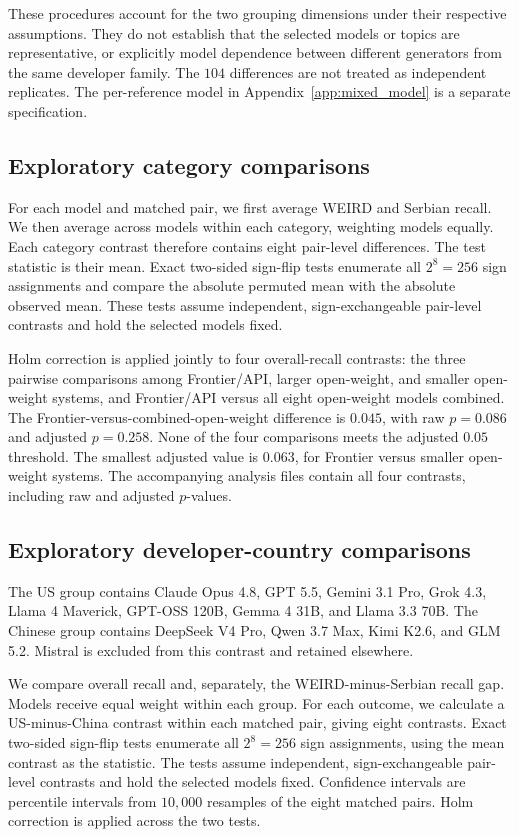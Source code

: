 \documentclass[11pt,a4paper]{article}
\begin{document}
These procedures account for the two grouping dimensions under their respective assumptions. They do not establish that the selected models or topics are representative, or explicitly model dependence between different generators from the same developer family. The $104$ differences are not treated as independent replicates. The per-reference model in Appendix~\ref{app:mixed_model} is a separate specification.

\subsection{Exploratory category comparisons}
\label{app:category-tests}
For each model and matched pair, we first average WEIRD and Serbian recall. We then average across models within each category, weighting models equally. Each category contrast therefore contains eight pair-level differences. The test statistic is their mean. Exact two-sided sign-flip tests enumerate all $2^8=256$ sign assignments and compare the absolute permuted mean with the absolute observed mean. These tests assume independent, sign-exchangeable pair-level contrasts and hold the selected models fixed.

Holm correction is applied jointly to four overall-recall contrasts: the three pairwise comparisons among Frontier/API, larger open-weight, and smaller open-weight systems, and Frontier/API versus all eight open-weight models combined. The Frontier-versus-combined-open-weight difference is $0.045$, with raw $p=0.086$ and adjusted $p=0.258$. None of the four comparisons meets the adjusted $0.05$ threshold. The smallest adjusted value is $0.063$, for Frontier versus smaller open-weight systems. The accompanying analysis files contain all four contrasts, including raw and adjusted $p$-values.

\subsection{Exploratory developer-country comparisons}
\label{app:country-tests}
The US group contains Claude Opus 4.8, GPT 5.5, Gemini 3.1 Pro, Grok 4.3, Llama 4 Maverick, GPT-OSS 120B, Gemma 4 31B, and Llama 3.3 70B. The Chinese group contains DeepSeek V4 Pro, Qwen 3.7 Max, Kimi K2.6, and GLM 5.2. Mistral is excluded from this contrast and retained elsewhere.

We compare overall recall and, separately, the WEIRD-minus-Serbian recall gap. Models receive equal weight within each group. For each outcome, we calculate a US-minus-China contrast within each matched pair, giving eight contrasts. Exact two-sided sign-flip tests enumerate all $2^8=256$ sign assignments, using the mean contrast as the statistic. The tests assume independent, sign-exchangeable pair-level contrasts and hold the selected models fixed. Confidence intervals are percentile intervals from $10{,}000$ resamples of the eight matched pairs. Holm correction is applied across the two tests.
\end{document}
